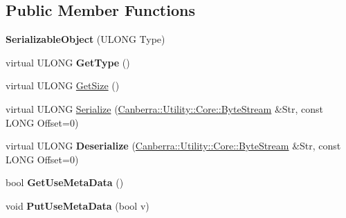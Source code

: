 \subsection*{Public Member Functions}
\begin{DoxyCompactItemize}
\item 
\mbox{\label{class_canberra_1_1_serialization_1_1_serializable_object_a0ef0ea4e4e766e15086f54ebb05744cd}} 
{\bfseries Serializable\+Object} (U\+L\+O\+NG Type)
\item 
\mbox{\label{class_canberra_1_1_serialization_1_1_serializable_object_ab619feca491ffd7547c45f0ec6dcfe0b}} 
virtual U\+L\+O\+NG {\bfseries Get\+Type} ()
\item 
virtual U\+L\+O\+NG \hyperlink{class_canberra_1_1_serialization_1_1_serializable_object_a1af5a56d77422d2d6f56d1fb8bc9f376_a1af5a56d77422d2d6f56d1fb8bc9f376}{Get\+Size} ()
\item 
virtual U\+L\+O\+NG \hyperlink{class_canberra_1_1_serialization_1_1_serializable_object_a33e593c04b50f36e8dad06b3b7471a9c_a33e593c04b50f36e8dad06b3b7471a9c}{Serialize} (\hyperlink{class_canberra_1_1_utility_1_1_core_1_1_byte_stream}{Canberra\+::\+Utility\+::\+Core\+::\+Byte\+Stream} \&Str, const L\+O\+NG Offset=0)
\item 
\mbox{\label{class_canberra_1_1_serialization_1_1_serializable_object_a430c3ea76c8389e480d48a97ff2df2d0}} 
virtual U\+L\+O\+NG {\bfseries Deserialize} (\hyperlink{class_canberra_1_1_utility_1_1_core_1_1_byte_stream}{Canberra\+::\+Utility\+::\+Core\+::\+Byte\+Stream} \&Str, const L\+O\+NG Offset=0)
\item 
\mbox{\label{class_canberra_1_1_serialization_1_1_serializable_object_aba841e892df8481bd3fdca757e6f10d4}} 
bool {\bfseries Get\+Use\+Meta\+Data} ()
\item 
\mbox{\label{class_canberra_1_1_serialization_1_1_serializable_object_a3fd4cc1bf197d9367f49b76c71582058}} 
void {\bfseries Put\+Use\+Meta\+Data} (bool v)
\end{DoxyCompactItemize}
